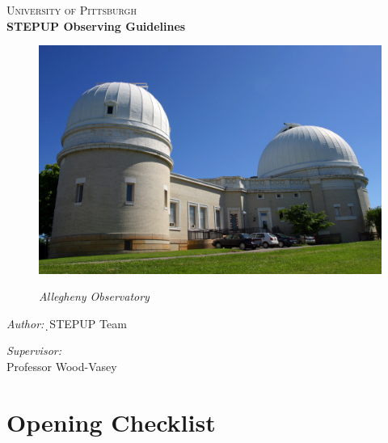 \documentclass[11pt]{report}
\begin{document}
\begin{titlepage}
\begin{center}
\textsc{\LARGE University of Pittsburgh}\\[1.5cm]
{ \huge \bfseries STEPUP Observing Guidelines\\[0.4cm] } 


\begin{figure}[!h]
\begin{center}
\includegraphics[totalheight=.5\textheight]{Title.jpg}
\end{center}
\begin{center}
\emph{Allegheny Observatory}
\end{center}
\end{figure}

\vfill
\begin{minipage}{0.4\textwidth}
\begin{flushleft} \large
\emph{Author:}\d\
STEPUP Team
\end{flushleft}
\end{minipage}
\begin{minipage}{0.4\textwidth}
\begin{flushright} \large
\emph{Supervisor:} \\
Professor Wood-Vasey
\end{flushright}
\end{minipage}

\end{center}
\end{titlepage}
\tableofcontents
\chapter{Opening Checklist} 
	
\end{document}
